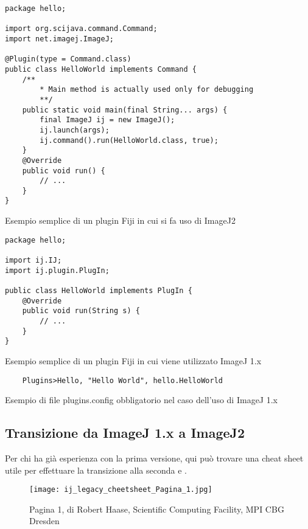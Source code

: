 \begin{listing}[H]
\begin{verbatim}
package hello;

import org.scijava.command.Command;
import net.imagej.ImageJ;

@Plugin(type = Command.class)
public class HelloWorld implements Command {
    /**
        * Main method is actually used only for debugging
        **/
    public static void main(final String... args) {
        final ImageJ ij = new ImageJ();
        ij.launch(args);
        ij.command().run(HelloWorld.class, true);
    }
    @Override
    public void run() {
        // ...
    }
}
\end{verbatim}
\caption{Esempio semplice di un plugin Fiji in cui si fa uso di ImageJ2} \label{lst:ImageJ2}
\end{listing}
    
\begin{listing}[H]
\begin{verbatim}
package hello;

import ij.IJ;
import ij.plugin.PlugIn;

public class HelloWorld implements PlugIn {
    @Override
    public void run(String s) {
    	// ...
    }
}
\end{verbatim}
\caption{Esempio semplice di un plugin Fiji in cui viene utilizzato ImageJ 1.x} \label{lst:ImageJ1}
\end{listing}

\begin{listing}[H]
\begin{verbatim}
	Plugins>Hello, "Hello World", hello.HelloWorld
\end{verbatim}
\caption{Esempio di file plugins.config obbligatorio nel caso dell'uso di ImageJ 1.x} \label{lst:ImageJ1Config}
\end{listing}

\subsection{Transizione da ImageJ 1.x a ImageJ2}
\noindent Per chi ha già esperienza con la prima versione, qui può trovare una cheat sheet utile per effettuare la transizione alla seconda  e .

\begin{figure}[H]
\centering
\texttt{[image: ij\_legacy\_cheetsheet\_Pagina\_1.jpg]}
\caption{Pagina 1, di Robert Haase, Scientific Computing Facility, MPI CBG Dresden}
\label{fig:6}
\end{figure}

